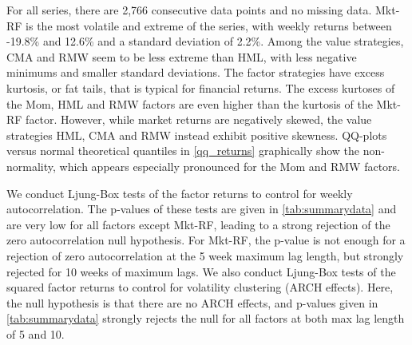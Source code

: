 For all series, there are 2,766 consecutive data points and no missing data. Mkt-RF is the most volatile and extreme of the series, with weekly returns between -19.8\% and 12.6\% and a standard deviation of 2.2\%. Among the value strategies, CMA and RMW seem to be less extreme than HML, with less negative minimums and smaller standard deviations. The factor strategies have excess kurtosis, or fat tails, that is typical for financial returns. The excess kurtoses of the Mom, HML and RMW factors are even higher than the kurtosis of the Mkt-RF factor. However, while market returns are negatively skewed, the value strategies HML, CMA and RMW instead exhibit positive skewness. QQ-plots versus normal theoretical quantiles in \autoref{qq_returns} graphically show the non-normality, which appears especially pronounced for the Mom and RMW factors.

We conduct Ljung-Box tests of the factor returns to control for weekly autocorrelation. The p-values of these tests are given in \autoref{tab:summarydata} and are very low for all factors except Mkt-RF, leading to a strong rejection of the zero autocorrelation null hypothesis. For Mkt-RF, the p-value is not enough for a rejection of zero autocorrelation at the 5 week maximum lag length, but strongly rejected for 10 weeks of maximum lags. We also conduct Ljung-Box tests of the squared factor returns to control for volatility clustering (ARCH effects). Here, the null hypothesis is that there are no ARCH effects, and p-values given in \autoref{tab:summarydata} strongly rejects the null for all factors at both max lag length of 5 and 10.

